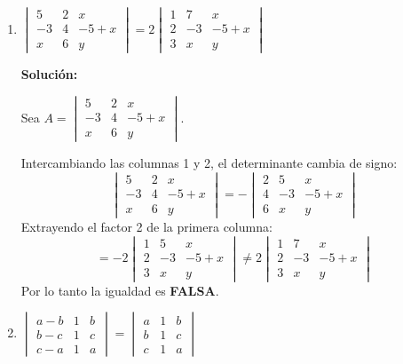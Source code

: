 \documentclass[12pt]{article}
\newcommand{\solucion}{%
    \vspace{0.8em}%
    \textbf{Solución:}%
}
\begin{document}
\begin{enumerate}[label=\alph*.-]
    \item $\begin{vmatrix} 5 & 2 & x \\ -3 & 4 & -5 + x \\ x & 6 & y \end{vmatrix} = 2\begin{vmatrix} 1 & 7 & x \\ 2 & -3 & -5 + x \\ 3 & x & y \end{vmatrix}$

    \solucion

    Sea $A=\begin{vmatrix}5&2&x\\-3&4&{-5+x}\\x&6&y\end{vmatrix}$.

    Intercambiando las columnas 1 y 2, el determinante cambia de signo:
    \[
    \begin{vmatrix}5&2&x\\-3&4&{-5+x}\\x&6&y\end{vmatrix}
    = -\begin{vmatrix}2&5&x\\4&-3&{-5+x}\\6&x&y\end{vmatrix}
    \]
    Extrayendo el factor 2 de la primera columna:
    \[
    = -2\begin{vmatrix}1&5&x\\2&-3&{-5+x}\\3&x&y\end{vmatrix}
    \neq
    2\begin{vmatrix}1&7&x\\2&{-3}&{-5+x}\\3&x&y\end{vmatrix}
    \]
    Por lo tanto la igualdad es \textbf{FALSA}.

    \item $\begin{vmatrix} a - b & 1 & b \\ b - c & 1 & c \\ c - a & 1 & a \end{vmatrix} = \begin{vmatrix} a & 1 & b \\ b & 1 & c \\ c & 1 & a \end{vmatrix}$


\end{enumerate}
\end{document}

